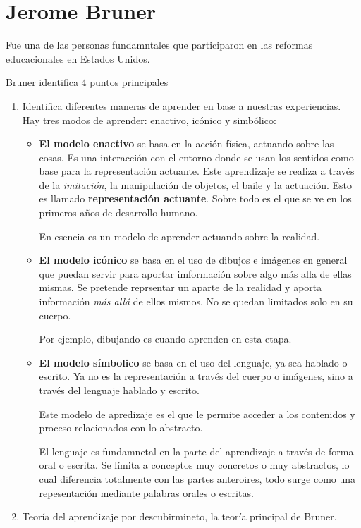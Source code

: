 \documentclass[12pt]{report}
\newcounter{it}
\theoremstyle{largebreak}
\begin{document}
    \section{Jerome Bruner}

    Fue una de las personas fundamntales que participaron en las reformas educacionales en Estados Unidos.

    Bruner identifica 4 puntos principales

    \begin{enumerate}
        \item Identifica diferentes maneras de aprender en base a nuestras experiencias. Hay tres modos de aprender: enactivo, icónico y simbólico:
        \begin{itemize}
            \item \textbf{El modelo enactivo} se basa en la acción física, actuando sobre las cosas. Es una interacción con el entorno donde se usan los sentidos como base para la representación actuante. Este aprendizaje se realiza a través de la \textit{imitación}, la manipulación de objetos, el baile y la actuación. Esto es llamado \textbf{representación actuante}. Sobre todo es el que se ve en los primeros años de desarrollo humano.
            
            En esencia es un modelo de aprender actuando sobre la realidad.
            \item \textbf{El modelo icónico} se basa en el uso de dibujos e imágenes en general que puedan servir para aportar imformación sobre algo más alla de ellas mismas. Se pretende reprsentar un aparte de la realidad y aporta información \textit{más allá} de ellos mismos. No se quedan limitados solo en su cuerpo.
            
            Por ejemplo, dibujando es cuando aprenden en esta etapa.

            \item \textbf{El modelo símbolico} se basa en el uso del lenguaje, ya sea hablado o escrito. Ya no es la representación a través del cuerpo o imágenes, sino a través del lenguaje hablado y escrito.
            
            Este modelo de apredizaje es el que le permite acceder a los contenidos y proceso relacionados con lo abstracto.

            El lenguaje es fundamnetal en la parte del aprendizaje a través de forma oral o escrita. Se límita a conceptos muy concretos o muy abstractos, lo cual diferencia totalmente con las partes anteroires, todo surge como una repesentación mediante palabras orales o escritas.
        \end{itemize}
        \item Teoría del aprendizaje por descubirmineto, la teoría principal de Bruner.
        

\end{enumerate}
\end{document}
